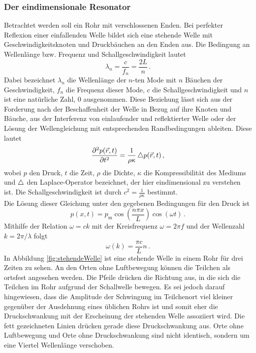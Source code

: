 \subsubsection{Der eindimensionale Resonator}
Betrachtet werden soll ein Rohr mit verschlossenen Enden. Bei perfekter Reflexion einer einfallenden Welle bildet sich eine stehende Welle mit Geschwindigkeitsknoten und Druckbäuchen an den Enden aus. Die Bedingung an Wellenlänge bzw. Frequenz und Schallgeschwindigkeit lautet
\begin{equation}
  \lambda_n = \frac{c}{f_n} = \frac{2L}{n}\,.
  \label{eqn:stehendeWelle}
\end{equation}
Dabei bezeichnet $\lambda_n$ die Wellenlänge der $n$-ten Mode mit $n$ Bäuchen der Geschwindigkeit, $f_n$ die Frequenz dieser Mode, $c$ die Schallgeschwindigkeit und $n$ ist eine natürliche Zahl, 0 ausgenommen.
Diese Beziehung lässt sich aus der Forderung nach der Beschaffenheit der Welle in Bezug auf ihre Knoten und Bäuche, aus der Interferenz von einlaufender und reflektierter Welle oder der Lösung der Wellengleichung mit entsprechenden Randbedingungen ableiten. Diese lautet
\begin{equation}
  \frac{\partial^2 p(\vec{r},t)}{\partial t^2} = \frac{1}{\rho \kappa} \mathop{}\!\mathbin\bigtriangleup p(\vec{r},t)\,,
  \label{eqn:wellengleichung}
\end{equation}
wobei $p$ den Druck, $t$ die Zeit, $\rho$ die Dichte, $\kappa$ die Kompressibilität des Mediums und $\mathop{}\!\mathbin\bigtriangleup$ den Laplace-Operator bezeichnet, der hier eindimensional zu verstehen ist. Die Schallgeschwindigkeit ist durch $c^2 = \frac{1}{\rho \kappa}$ bestimmt.\\
Die Lösung dieser Gleichung unter den gegebenen Bedingungen für den Druck ist
\begin{equation}
  p(x,t) = p_\text{m} \cos\left(\frac{n \pi x}{L}\right) \cos(\omega t)\,.
  \label{eqn:stehendeWelle2}
\end{equation}
Mithilfe der Relation $\omega = ck$ mit der Kreisfrequenz $\omega = 2 \pi f$ und der Wellenzahl $k = 2 \pi / \lambda$ folgt
\begin{equation}
  \omega(k) = \frac{\pi c}{L} n\,.
  \label{eqn:dispersionKlassisch}
\end{equation}
In Abbildung \ref{fig:stehendeWelle} ist eine stehende Welle in einem Rohr für drei Zeiten zu sehen. An den Orten ohne Luftbewegung können die Teilchen als ortsfest angesehen werden. Die Pfeile drücken die Richtung aus, in die sich die Teilchen im Rohr aufgrund der Schallwelle bewegen. Es sei jedoch darauf hingewiesen, dass die Amplitude der Schwingung im Teilchenort viel kleiner gegenüber der Ausdehnung eines üblichen Rohrs ist und somit eher die Druckschwankung mit der Erscheinung der stehenden Welle assoziiert wird. Die fett gezeichneten Linien drücken gerade diese Druckschwankung aus. Orte ohne Luftbewegung und Orte ohne Druckschwankung sind nicht identisch, sondern um eine Viertel Wellenlänge verschoben.

